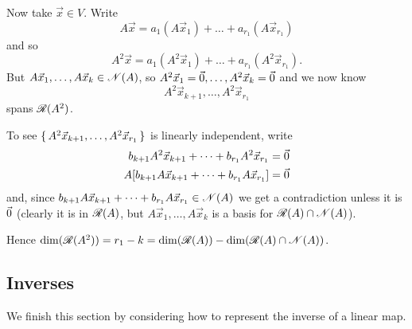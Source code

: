 \begin{exercises}
\begin{answer}
      Now take \( \vec{x}\in V \).
      Write
      \begin{equation*}
        A\vec{x}=a_1(A\vec{x}_1)+\dots+a_{r_1}(A\vec{x}_{r_1})
      \end{equation*}
      and so
      \begin{equation*}
        A^2\vec{x}=a_1(A^2\vec{x}_1)+\dots+a_{r_1}(A^2\vec{x}_{r_1}).
      \end{equation*}
      But \( A\vec{x}_1,\dots,A\vec{x}_k\in\mathscr{N}(A) \), so
      \( A^2\vec{x}_1=\vec{0},\dots,A^2\vec{x}_k=\vec{0} \) and we now know
      \begin{equation*}
        A^2\vec{x}_{k+1},\dots,A^2\vec{x}_{r_1}
      \end{equation*}
      spans \( \mathscr{R}(A^2) \).

      To see \( \mbox{$\{\,A^2\vec{x}_{k+1},\dots,A^2\vec{x}_{r_1}\,\}$} \)
      is linearly independent, write
      \begin{align*}
        b_{k+1}A^2\vec{x}_{k+1}+\dots+b_{r_1}A^2\vec{x}_{r_1}
        &=\vec{0}                                                 \\
        A[b_{k+1}A\vec{x}_{k+1}+\dots+b_{r_1}A\vec{x}_{r_1}]
        &=\vec{0}
      \end{align*}
      and, since
      \( b_{k+1}A\vec{x}_{k+1}+\dots+b_{r_1}A\vec{x}_{r_1}\in\mathscr{N}(A) \)
      we get a contradiction unless it is \( \vec{0} \) (clearly it is in
      \( \mathscr{R}(A) \), but \( A\vec{x}_1,\ldots,A\vec{x}_k \) is a basis
      for \( \mathscr{R}(A)\cap\mathscr{N}(A) \)).

      Hence \( \dim(\mathscr{R}(A^2))=r_1-k=\dim(\mathscr{R}(A))-
                \dim(\mathscr{R}(A)\cap\mathscr{N}(A)) \).  
    \end{answer}
\end{exercises}























\subsection{Inverses}
We finish this section by considering how to represent the 
inverse of a linear map.

